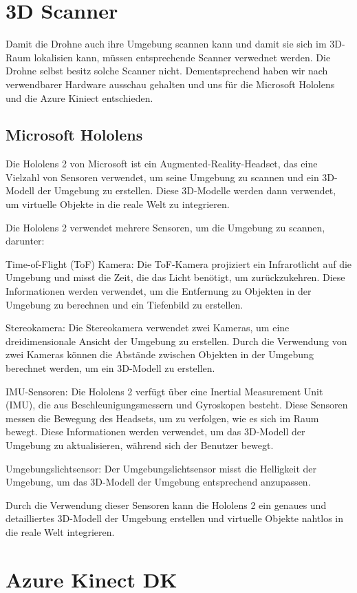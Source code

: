 \section{3D Scanner}
Damit die Drohne auch ihre Umgebung scannen kann und damit sie sich im 3D-Raum lokalisien kann, müssen entsprechende Scanner verwednet werden. Die Drohne selbst besitz solche Scanner nicht. Dementsprechend haben wir nach verwendbarer Hardware ausschau gehalten und uns für die Microsoft Hololens und die Azure Kiniect entschieden.

\subsection{Microsoft Hololens}
Die Hololens 2 von Microsoft ist ein Augmented-Reality-Headset, das eine Vielzahl von Sensoren verwendet, um seine Umgebung zu scannen und ein 3D-Modell der Umgebung zu erstellen. Diese 3D-Modelle werden dann verwendet, um virtuelle Objekte in die reale Welt zu integrieren.

Die Hololens 2 verwendet mehrere Sensoren, um die Umgebung zu scannen, darunter:

Time-of-Flight (ToF) Kamera: Die ToF-Kamera projiziert ein Infrarotlicht auf die Umgebung und misst die Zeit, die das Licht benötigt, um zurückzukehren. Diese Informationen werden verwendet, um die Entfernung zu Objekten in der Umgebung zu berechnen und ein Tiefenbild zu erstellen.

Stereokamera: Die Stereokamera verwendet zwei Kameras, um eine dreidimensionale Ansicht der Umgebung zu erstellen. Durch die Verwendung von zwei Kameras können die Abstände zwischen Objekten in der Umgebung berechnet werden, um ein 3D-Modell zu erstellen.

IMU-Sensoren: Die Hololens 2 verfügt über eine Inertial Measurement Unit (IMU), die aus Beschleunigungsmessern und Gyroskopen besteht. Diese Sensoren messen die Bewegung des Headsets, um zu verfolgen, wie es sich im Raum bewegt. Diese Informationen werden verwendet, um das 3D-Modell der Umgebung zu aktualisieren, während sich der Benutzer bewegt.

Umgebungslichtsensor: Der Umgebungslichtsensor misst die Helligkeit der Umgebung, um das 3D-Modell der Umgebung entsprechend anzupassen.

Durch die Verwendung dieser Sensoren kann die Hololens 2 ein genaues und detailliertes 3D-Modell der Umgebung erstellen und virtuelle Objekte nahtlos in die reale Welt integrieren.

\section{Azure Kinect DK}

